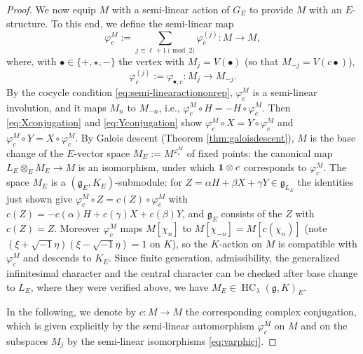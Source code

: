 \documentclass[a4paper,12pt,reqno]{amsart}
\DeclareMathOperator{\HC}{\mathrm{HC}}
\theoremstyle{plain}
\theoremstyle{remark}
\begin{document}
\begin{proof}
    \smallskip
    We now equip $M$ with a semi-linear action of $G_E$ to provide $M$ with an $E$-structure. To this end, we define the semi-linear map
    \[
    \varphi_c^M:=\sum_{j\equiv\ell+1\pmod{2}}\varphi_{c}^{(j)}\colon M\to M,
    \]
    where, with $\bullet\in\{+,\star,-\}$ the vertex with $M_j=V(\bullet)$ (so that $M_{-j}=V(c\bullet)$),
    \begin{equation}
      \varphi_c^{(j)}:=\varphi_{\bullet,c}\colon M_{j}\to M_{-j}.
      \label{eq:varphicj}
    \end{equation}
    By the cocycle condition \eqref{eq:semi-linearactiononrep}, $\varphi_c^M$ is a semi-linear involution, and it maps $M_n$ to $M_{-n}$, i.e., $\varphi_c^M\circ H=-H\circ\varphi_c^M$. Then \eqref{eq:Xconjugation} and \eqref{eq:Yconjugation} show $\varphi_c^M\circ X=Y\circ\varphi_c^M$ and $\varphi_c^M\circ Y=X\circ\varphi_c^M$. By Galois descent (Theorem \ref{thm:galoisdescent}), $M$ is the base change of the $E$-vector space $M_E:=M^{\varphi_c^M}$ of fixed points: the canonical map $L_E\otimes_E M_E\to M$ is an isomorphism, under which ${\bf1}\otimes c$ corresponds to $\varphi_c^M$. The space $M_E$ is a $(\mathfrak{g}_E,K_E)$-submodule: for $Z=\alpha H+\beta X+\gamma Y\in\mathfrak{g}_{L_E}$ the identities just shown give $\varphi_c^M\circ Z=c(Z)\circ\varphi_c^M$ with $c(Z)=-c(\alpha)H+c(\gamma)X+c(\beta)Y$, and $\mathfrak{g}_E$ consists of the $Z$ with $c(Z)=Z$. Moreover $\varphi_c^M$ maps $M[\chi_n]$ to $M[\chi_{-n}]=M[c(\chi_n)]$ (note $(\xi+\sqrt{-1}\eta)(\xi-\sqrt{-1}\eta)=1$ on $K$), so the $K$-action on $M$ is compatible with $\varphi_c^M$ and descends to $K_E$. Since finite generation, admissibility, the generalized infinitesimal character and the central character can be checked after base change to $L_E$, where they were verified above, we have $M_E\in\HC_\lambda(\mathfrak{g},K)_E$.

    In the following, we denote by $c \colon M \to M$ the corresponding complex conjugation, which is given explicitly by the semi-linear automorphism $\varphi_c^M$ on $M$ and on the subspaces $M_j$ by the semi-linear isomorphisms \eqref{eq:varphicj}.


\end{proof}
\end{document}
